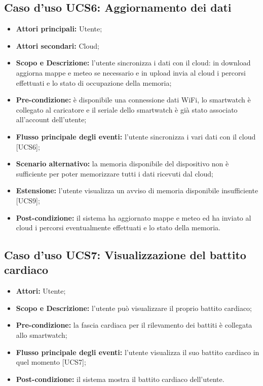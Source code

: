 \subsection{Caso d'uso UCS6: Aggiornamento dei dati}
\begin{itemize}
\item \textbf{Attori principali:} Utente;
\item \textbf{Attori secondari:} Cloud;
\item \textbf{Scopo e Descrizione:} l'utente sincronizza i dati con il cloud: in download aggiorna mappe e meteo se necessario e in upload invia al cloud i percorsi effettuati e lo stato di occupazione della memoria;
\item \textbf{Pre-condizione:} è disponibile una connessione dati WiFi, lo smartwatch è collegato al caricatore e il seriale dello smartwatch è già stato associato all'account dell'utente;
\item \textbf{Flusso principale degli eventi:} l'utente sincronizza i vari dati con il cloud [UCS6];
\item \textbf{Scenario alternativo:} la memoria disponibile del dispositivo non è sufficiente per poter memorizzare tutti i dati ricevuti dal cloud;
\item \textbf{Estensione:} l'utente visualizza un avviso di memoria disponibile insufficiente [UCS9];
\item \textbf{Post-condizione:} il sistema ha aggiornato mappe e meteo ed ha inviato al cloud i percorsi eventualmente effettuati e lo stato della memoria.
\end{itemize}

\subsection{Caso d'uso UCS7: Visualizzazione del battito cardiaco}
\begin{itemize}
\item \textbf{Attori:} Utente;
\item \textbf{Scopo e Descrizione:} l'utente può visualizzare il proprio battito cardiaco;
\item \textbf{Pre-condizione:} la fascia cardiaca per il rilevamento dei battiti è collegata allo smartwatch;
\item \textbf{Flusso principale degli eventi:} l'utente visualizza il suo battito cardiaco in quel momento [UCS7];
\item \textbf{Post-condizione:} il sistema mostra il battito cardiaco dell'utente.
\end{itemize}

